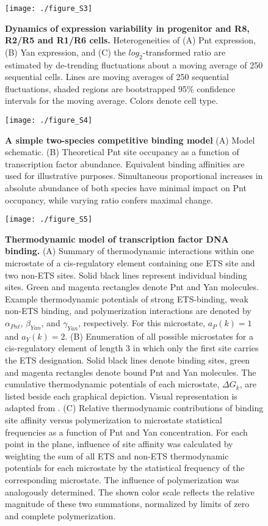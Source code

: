 \begin{figure}[h]
\centering
\texttt{[image: ./figure\_S3]}
\caption[Dynamics of expression variability in progenitors and R cells.]{\textbf{Dynamics of expression variability in progenitor and R8, R2/R5 and R1/R6 cells.} Heterogeneities of (A) Pnt expression, (B) Yan expression, and (C) the $log_2$-transformed ratio are estimated by de-trending fluctuations about a moving average of 250 sequential cells. Lines are moving averages of 250 sequential fluctuations, shaded regions are bootstrapped 95\% confidence intervals for the moving average. Colors denote cell type.}
\label{fig:ratio:figS3}
\end{figure}

\begin{figure}[h]
\centering
\texttt{[image: ./figure\_S4]}
\caption[Simple two-species competitive binding model]{\textbf{A simple two-species competitive binding model} (A) Model schematic. (B) Theoretical Pnt site occupancy as a function of transcription factor abundance. Equivalent binding affinities are used for illustrative purposes. Simultaneous proportional increases in absolute abundance of both species have minimal impact on Pnt occupancy, while varying ratio confers maximal change.}
\label{fig:ratio:figS4}
\end{figure}

\begin{figure}[h]
\centering
\texttt{[image: ./figure\_S5]}
\caption[Thermodynamic model of transcription factor DNA binding.]{\textbf{Thermodynamic model of transcription factor DNA binding.} (A) Summary of thermodynamic interactions within one microstate of a cis-regulatory element containing one ETS site and two non-ETS sites. Solid black lines represent individual binding sites. Green and magenta rectangles denote Pnt and Yan molecules. Example thermodynamic potentials of strong ETS-binding, weak non-ETS binding, and polymerization interactions are denoted by $\alpha_{Pnt}$, $\beta_{Yan}$, and $\gamma_{Yan}$, respectively. For this microstate, $a_P(k)=1$ and $a_Y(k)=2$. (B) Enumeration of all possible microstates for a cis-regulatory element of length 3 in which only the first site carries the ETS designation. Solid black lines denote binding sites, green and magenta rectangles denote bound Pnt and Yan molecules. The cumulative thermodynamic potentials of each microstate, $\Delta G_k$, are listed beside each graphical depiction. Visual representation is adapted from \cite{Hope2017}. (C) Relative thermodynamic contributions of binding site affinity versus polymerization to microstate statistical frequencies as a function of Pnt and Yan concentration. For each point in the plane, influence of site affinity was calculated by weighting the sum of all ETS and non-ETS thermodynamic potentials for each microstate by the statistical frequency of the corresponding microstate. The influence of polymerization was analogously determined. The shown color scale reflects the relative magnitude of these two summations, normalized by limits of zero and complete polymerization.}
\label{fig:ratio:figS5}
\end{figure}

